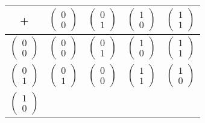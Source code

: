 \documentclass{scrreprt}
\begin{document}
\begin{enumerate}[(i)]
  \begin{tabular}{|c|cccc|}
    \hline
    +
    & $\begin{pmatrix} 0 \\ 0 \end{pmatrix}$
    & $\begin{pmatrix} 0 \\ 1 \end{pmatrix}$
    & $\begin{pmatrix} 1 \\ 0 \end{pmatrix}$
    & $\begin{pmatrix} 1 \\ 1 \end{pmatrix}$ \\
    \hline
    $\begin{pmatrix} 0 \\ 0 \end{pmatrix}$
    & $\begin{pmatrix} 0 \\ 0 \end{pmatrix}$
    & $\begin{pmatrix} 0 \\ 1 \end{pmatrix}$
    & $\begin{pmatrix} 1 \\ 0 \end{pmatrix}$
    & $\begin{pmatrix} 1 \\ 1 \end{pmatrix}$ \\
    $\begin{pmatrix} 0 \\ 1 \end{pmatrix}$
    & $\begin{pmatrix} 0 \\ 1 \end{pmatrix}$
    & $\begin{pmatrix} 0 \\ 0 \end{pmatrix}$
    & $\begin{pmatrix} 1 \\ 1 \end{pmatrix}$
    & $\begin{pmatrix} 1 \\ 0 \end{pmatrix}$ \\
    $\begin{pmatrix} 1 \\ 0 \end{pmatrix}$

\end{tabular}
\end{enumerate}
\end{document}
